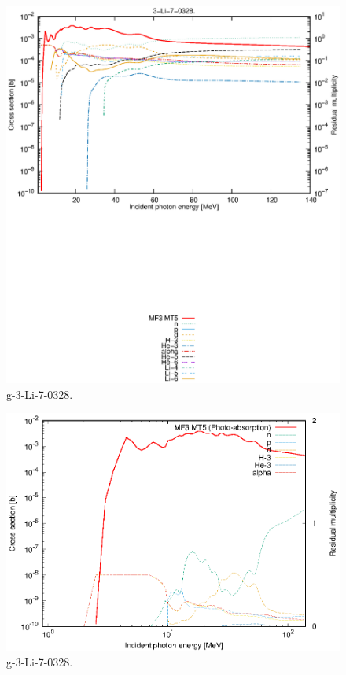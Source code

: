 \begin{figure}
 \includegraphics[width=\linewidth]{eps/g_3-Li-7_0328.eps}
  \caption{g-3-Li-7-0328.}
\end{figure}
\newpage \clearpage

\begin{figure}
 \includegraphics[width=\linewidth]{eps-log/g_3-Li-7_0328.eps}
 \caption{g-3-Li-7-0328.}
\end{figure}
\newpage \clearpage

